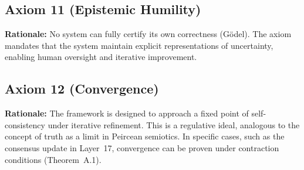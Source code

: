 \subsection*{Axiom 11 (Epistemic Humility)}
\textbf{Rationale:} No system can fully certify its own correctness (G\"odel). The axiom mandates that the system maintain explicit representations of uncertainty, enabling human oversight and iterative improvement.

\subsection*{Axiom 12 (Convergence)}
\textbf{Rationale:} The framework is designed to approach a fixed point of self-consistency under iterative refinement. This is a regulative ideal, analogous to the concept of truth as a limit in Peircean semiotics. In specific cases, such as the consensus update in Layer~17, convergence can be proven under contraction conditions (Theorem~A.1).